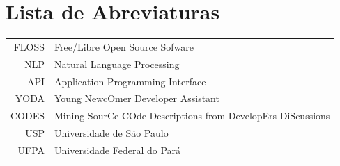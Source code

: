 {
\raggedbottom


\chapter*{Lista de Abreviaturas}

\begin{tabular}{rl}
    FLOSS         & Free/Libre Open Source Sofware\\
    NLP         & Natural Language Processing\\
    API & Application Programming Interface \\
    YODA & Young NewcOmer Developer Assistant \\
    CODES & Mining SourCe COde Descriptions from DevelopErs DiScussions \\
    USP & Universidade de São Paulo \\
    UFPA & Universidade Federal do Pará \\
\end{tabular}


\begin{tabular}{rl}
\end{tabular}

\clearpage


\disablenewpage{\listoffigures}

\disablenewpage{\listoftables}


\tableofcontents

} %

